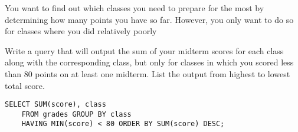\begin{blocksection}
\question 
You want to find out which classes you need to prepare for the most by determining how many points you have so far. However, you only want to do so for classes where you did relatively poorly

Write a query that will output the sum of your midterm scores for each class along with the corresponding class, but only for classes in which you scored less than 80 points on at least one midterm. List the output from highest to lowest total score.

\begin{solution}[1.5in]
\begin{lstlisting}
SELECT SUM(score), class
    FROM grades GROUP BY class
    HAVING MIN(score) < 80 ORDER BY SUM(score) DESC;
\end{lstlisting}
\end{solution}
\end{blocksection}
